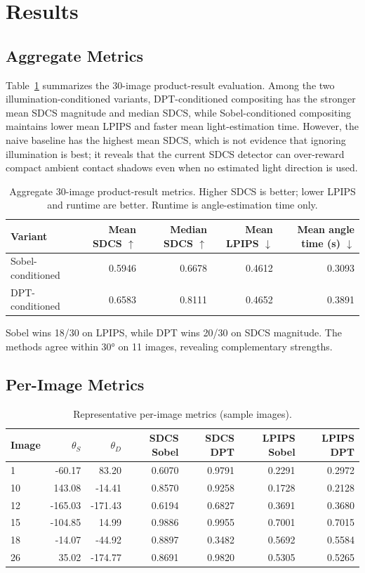 \documentclass{article}
\begin{document}
\section{Results}

\subsection{Aggregate Metrics}
Table~\ref{tab:aggregate} summarizes the 30-image product-result evaluation. Among the two illumination-conditioned variants, DPT-conditioned compositing has the stronger mean SDCS magnitude and median SDCS, while Sobel-conditioned compositing maintains lower mean LPIPS and faster mean light-estimation time. However, the naive baseline has the highest mean SDCS, which is not evidence that ignoring illumination is best; it reveals that the current SDCS detector can over-reward compact ambient contact shadows even when no estimated light direction is used.

\begin{table}[H]
\centering
\caption{Aggregate 30-image product-result metrics. Higher SDCS is better; lower LPIPS and runtime are better. Runtime is angle-estimation time only.}
\label{tab:aggregate}
\begin{tabular}{lrrrr}
\toprule
Variant & Mean SDCS $\uparrow$ & Median SDCS $\uparrow$ & Mean LPIPS $\downarrow$ & Mean angle time (s) $\downarrow$ \\
\midrule
Sobel-conditioned & 0.5946 & 0.6678 & 0.4612 & 0.3093 \\
DPT-conditioned & 0.6583 & 0.8111 & 0.4652 & 0.3891 \\
\bottomrule
\end{tabular}
\end{table}

Sobel wins 18/30 on LPIPS, while DPT wins 20/30 on SDCS magnitude. The methods agree within 30° on 11 images, revealing complementary strengths.


\subsection{Per-Image Metrics}
\begin{table}[H]
\centering
\caption{Representative per-image metrics (sample images).}
\label{tab:perimage}
\begin{tabular}{lrrrrrr}
\toprule
Image & $\theta_S$ & $\theta_D$ & SDCS Sobel & SDCS DPT & LPIPS Sobel & LPIPS DPT \\
\midrule
1 & -60.17 & 83.20 & 0.6070 & 0.9791 & 0.2291 & 0.2972 \\
10 & 143.08 & -14.41 & 0.8570 & 0.9258 & 0.1728 & 0.2128 \\
12 & -165.03 & -171.43 & 0.6194 & 0.6827 & 0.3691 & 0.3680 \\
15 & -104.85 & 14.99 & 0.9886 & 0.9955 & 0.7001 & 0.7015 \\
18 & -14.07 & -44.92 & 0.8897 & 0.3482 & 0.5692 & 0.5584 \\
26 & 35.02 & -174.77 & 0.8691 & 0.9820 & 0.5305 & 0.5265 \\
\bottomrule
\end{tabular}
\end{table}
\end{document}

